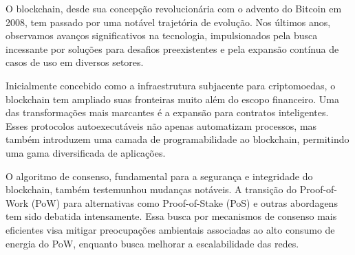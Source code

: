  







O blockchain, desde sua concepção revolucionária com o advento do Bitcoin em 2008, tem passado por uma notável trajetória de evolução. Nos últimos anos, observamos avanços significativos na tecnologia, impulsionados pela busca incessante por soluções para desafios preexistentes e pela expansão contínua de casos de uso em diversos setores.

Inicialmente concebido como a infraestrutura subjacente para criptomoedas, o blockchain tem ampliado suas fronteiras muito além do escopo financeiro. Uma das transformações mais marcantes é a expansão para contratos inteligentes. Esses protocolos autoexecutáveis não apenas automatizam processos, mas também introduzem uma camada de programabilidade ao blockchain, permitindo uma gama diversificada de aplicações.

O algoritmo de consenso, fundamental para a segurança e integridade do blockchain, também testemunhou mudanças notáveis. A transição do Proof-of-Work (PoW) para alternativas como Proof-of-Stake (PoS) e outras abordagens tem sido debatida intensamente. Essa busca por mecanismos de consenso mais eficientes visa mitigar preocupações ambientais associadas ao alto consumo de energia do PoW, enquanto busca melhorar a escalabilidade das redes.

